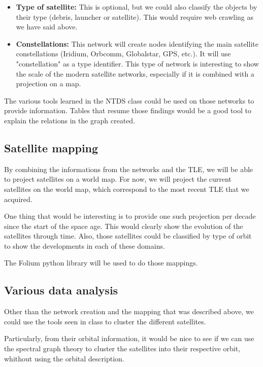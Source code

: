 \documentclass[11pt,letterpaper]{article}
\begin{document}
\begin{itemize}
    \item \textbf{Type of satellite:} This is optional, but we could also classify the objects by their type (debris, launcher or satellite). This would require web crawling as we have said above.

    \item \textbf{Constellations:} This network will create nodes identifying the main satellite constellations (Iridium, Orbcomm, Globalstar, GPS, etc.).
        It will use "constellation" as a type identifier.
        This type of network is interesting to show the scale of the modern satellite networks, especially if it is combined with a projection on a map.
\end{itemize}

The various tools learned in the NTDS class could be used on those networks to provide information.
Tables that resume those findings would be a good tool to explain the relations in the graph created.


\subsection{Satellite mapping}

By combining the informations from the networks and the TLE, we will be able to project satellites on a world map.
For now, we will project the current satellites on the world map, which correspond to the most recent TLE that we acquired.

 One thing that would be interesting is to provide one such projection per decade since the start of the space age.
 This would clearly show the evolution of the satellites through time.
 Also, those satellites could be classified by type of orbit to show the developments in each of these domains.

 The Folium python library will be used to do those mappings.

 \subsection{Various data analysis}
 
 Other than the network creation and the mapping that was described above, we could use the tools seen in class to cluster the different satellites.

 Particularly, from their orbital information, it would be nice to see if we can use the spectral graph theory to cluster the satellites into their respective orbit, whithout using the orbital description.
\end{document}
